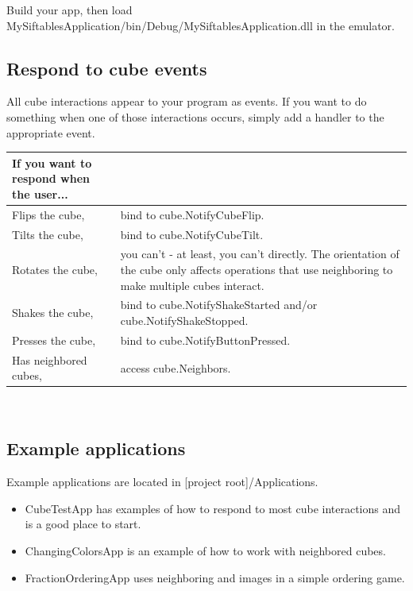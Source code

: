 \documentclass[12pt]{article}
\begin{document}
Build your app, then load MySiftablesApplication/bin/Debug/MySiftablesApplication.dll in the emulator.


\subsection{Respond to cube events}
All cube interactions appear to your program as events. If you want to do something when one of those interactions occurs, simply add a handler to the appropriate event.

    \begin{tabular}{ | p{2in} | p{4in} | }
    \hline
    \textbf{If you want to respond when the user...} &  \\\hline
    Flips the cube,  & bind to cube.NotifyCubeFlip. \\\hline
    Tilts the cube, & bind to cube.NotifyCubeTilt. \\\hline
    Rotates the cube, & you can't - at least, you can't directly. The orientation of the cube only affects operations that use neighboring to make multiple cubes interact. \\\hline
    Shakes the cube, & bind to cube.NotifyShakeStarted and/or cube.NotifyShakeStopped. \\\hline
    Presses the cube, & bind to cube.NotifyButtonPressed. \\\hline
    Has neighbored cubes, & access cube.Neighbors. \\\hline
    \end{tabular}\\
    
\subsection{Example applications}
Example applications are located in [project root]/Applications.

\begin{itemize}
\item CubeTestApp has examples of how to respond to most cube interactions and is a good place to start.
\item ChangingColorsApp is an example of how to work with neighbored cubes.
\item FractionOrderingApp uses neighboring and images in a simple ordering game.
\end{itemize}
\end{document}

